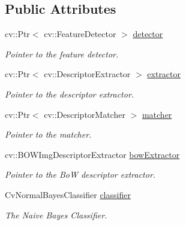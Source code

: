 \subsection*{Public Attributes}
\begin{DoxyCompactItemize}
\item 
\hypertarget{classLegoVision_aac40598f5ee1c3d47b6b522434c7fc22}{
cv::Ptr$<$ cv::FeatureDetector $>$ \hyperlink{classLegoVision_aac40598f5ee1c3d47b6b522434c7fc22}{detector}}
\label{classLegoVision_aac40598f5ee1c3d47b6b522434c7fc22}

\begin{DoxyCompactList}\small\item\em Pointer to the feature detector. \item\end{DoxyCompactList}\item 
\hypertarget{classLegoVision_a4e2c9693477194621fa73f91e344543f}{
cv::Ptr$<$ cv::DescriptorExtractor $>$ \hyperlink{classLegoVision_a4e2c9693477194621fa73f91e344543f}{extractor}}
\label{classLegoVision_a4e2c9693477194621fa73f91e344543f}

\begin{DoxyCompactList}\small\item\em Pointer to the descriptor extractor. \item\end{DoxyCompactList}\item 
\hypertarget{classLegoVision_a083739ef1478e1fa43e27572fcb5eab6}{
cv::Ptr$<$ cv::DescriptorMatcher $>$ \hyperlink{classLegoVision_a083739ef1478e1fa43e27572fcb5eab6}{matcher}}
\label{classLegoVision_a083739ef1478e1fa43e27572fcb5eab6}

\begin{DoxyCompactList}\small\item\em Pointer to the matcher. \item\end{DoxyCompactList}\item 
\hypertarget{classLegoVision_ac720b489af782d6be2458f74ace0d1f1}{
cv::BOWImgDescriptorExtractor \hyperlink{classLegoVision_ac720b489af782d6be2458f74ace0d1f1}{bowExtractor}}
\label{classLegoVision_ac720b489af782d6be2458f74ace0d1f1}

\begin{DoxyCompactList}\small\item\em Pointer to the BoW descriptor extractor. \item\end{DoxyCompactList}\item 
\hypertarget{classLegoVision_a4ce6b1656c577f92b3b51d897e52e2f1}{
CvNormalBayesClassifier \hyperlink{classLegoVision_a4ce6b1656c577f92b3b51d897e52e2f1}{classifier}}
\label{classLegoVision_a4ce6b1656c577f92b3b51d897e52e2f1}

\begin{DoxyCompactList}\small\item\em The Naive Bayes Classifier. \item\end{DoxyCompactList}\end{DoxyCompactItemize}


